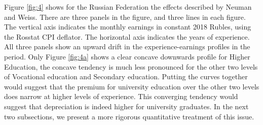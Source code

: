 \documentclass[12pt,a4paper]{article}
\numberwithin{equation}{section}
\begin{document}
Figure \ref{fig:4} shows for the Russian Federation the effects described by Neuman and Weiss. There are three panels in the figure, and three lines in each figure. The vertical axis indicates the monthly earnings in constant 2018 Rubles, using the Rosstat CPI deflator. The horizontal axis indicates the years of experience. All three panels show an upward drift in the experience-earnings profiles in the period. Only Figure \ref{fig:4a} shows a clear concave downwards profile for Higher Education, the concave tendency is much less pronounced for the other two levels of Vocational education and Secondary education. Putting the curves together would suggest that the premium for university education over the other two levels does narrow at higher levels of experience. This converging tendency would suggest that depreciation is indeed higher for university graduates. In the next two subsections, we present a more rigorous quantitative treatment of this issue.
	
\end{document}
